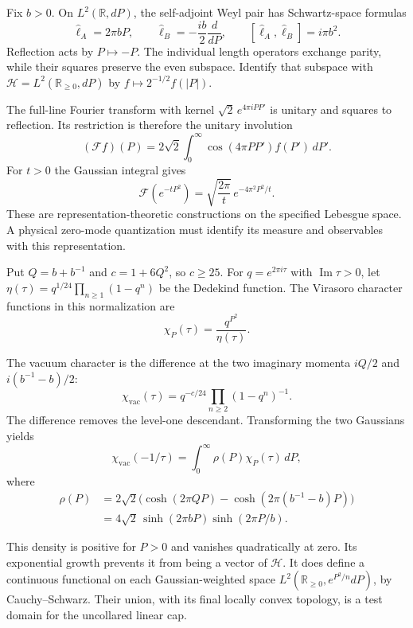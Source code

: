Fix $b>0$. On $L^2(\mathbb R,dP)$, the self-adjoint Weyl pair has
Schwartz-space formulas
\[
 \widehat\ell_A=2\pi bP,\qquad
 \widehat\ell_B=-\frac{ib}{2}\frac{d}{dP},\qquad
 [\widehat\ell_A,\widehat\ell_B]=i\pi b^2.
\]
Reflection acts by $P\mapsto-P$. The individual length operators
exchange parity, while their squares preserve the even subspace.
Identify that subspace with
$\mathcal H=L^2(\mathbb R_{\geq0},dP)$ by
$f\mapsto 2^{-1/2}f(|P|)$.

The full-line Fourier transform with kernel
$\sqrt2\,e^{4\pi iPP'}$ is unitary and squares to reflection.
Its restriction is therefore the unitary involution
\begin{equation}\label{mht:eq:gravity-cosine}
 (\mathcal Ff)(P)=2\sqrt2\int_0^\infty
                  \cos(4\pi PP')f(P')\,dP'.
\end{equation}
For $t>0$ the Gaussian integral gives
\begin{equation}\label{mht:eq:gravity-gaussian}
 \mathcal F(e^{-tP^2})
   =\sqrt{\frac{2\pi}{t}}\,e^{-4\pi^2P^2/t}.
\end{equation}
These are representation-theoretic constructions on the specified
Lebesgue space. A physical zero-mode quantization must identify its
measure and observables with this representation.

Put $Q=b+b^{-1}$ and $c=1+6Q^2$, so $c\geq25$.
For $q=e^{2\pi i\tau}$ with $\operatorname{Im}\tau>0$, let
$\eta(\tau)=q^{1/24}\prod_{n\geq1}(1-q^n)$ be the Dedekind function.
The Virasoro character functions in this normalization are
\[
 \chi_P(\tau)=\frac{q^{P^2}}{\eta(\tau)}.
\]

The vacuum character is the difference at the two imaginary momenta
$iQ/2$ and $i(b^{-1}-b)/2$:
\[
 \chi_{\mathrm{vac}}(\tau)
 =q^{-c/24}\prod_{n\geq2}(1-q^n)^{-1}.
\]
The difference removes the level-one descendant. Transforming the
two Gaussians yields
\[
 \chi_{\mathrm{vac}}(-1/\tau)
       =\int_0^\infty\rho(P)\chi_P(\tau)\,dP,
\]
where
\begin{equation}\label{mht:eq:gravity-cap-density}
 \begin{split}
 \rho(P)
 &=2\sqrt2\bigl(\cosh(2\pi QP)
                  -\cosh(2\pi(b^{-1}-b)P)\bigr)\\
 &=4\sqrt2\,\sinh(2\pi bP)\sinh(2\pi P/b).
 \end{split}
\end{equation}

This density is positive for $P>0$ and vanishes quadratically at zero.
Its exponential growth prevents it from being a vector of
$\mathcal H$. It does define a continuous functional on each
Gaussian-weighted space
$L^2(\mathbb R_{\geq0},e^{P^2/n}dP)$, by Cauchy--Schwarz.
Their union, with its final locally convex topology, is a test domain
for the uncollared linear cap.


